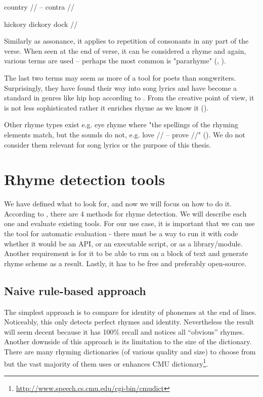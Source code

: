 country // -- contra //

hickory dickory dock //

\noindent Similarly as assonance, it applies to repetition of consonants in any part of the verse. When seen at the end of verse, it can be considered a rhyme and again, various terms are used -- perhaps the most common is "pararhyme" (\cite{britannica}, \cite{oxforddict2008literary}).
\newline

The last two terms may seem as more of a tool for poets than songwriters. Surprisingly, they have found their way into song lyrics and have become a standard in genres like hip hop according to \cite{vanphonological}. From the creative point of view, it is not less sophisticated rather it enriches rhyme as we know it (\cite{brogan2016poeticterms}).


Other rhyme types exist e.g. eye rhyme where "the spellings of the rhyming elements match, but the sounds do not, e.g. love // -- prove //" (\cite{oxforddict2008literary}). We do not consider them relevant for song lyrics or the purpose of this thesis.


\section{Rhyme detection tools}\label{rhyme_detection_tools}
We have defined what to look for, and now we will focus on how to do it. According to \cite{plechac2017presentation}, there are 4 methods for rhyme detection. We will describe each one and evaluate existing tools. For our use case, it is important that we can use the tool for automatic evaluation - there must be a way to run it with code whether it would be an API, or an executable script, or as a library/module. Another requirement is for it to be able to run on a block of text and generate rhyme scheme as a result. Lastly, it has to be free and preferably open-source.

\subsection{Naive rule-based approach} 
The simplest approach is to compare for identity of phonemes at the end of lines. Noticeably,  this only detects perfect rhymes and identity. Nevertheless the result will seem decent because it has 100\% recall and notices all ``obvious'' rhymes. Another downside of this approach is its limitation to the size of the dictionary. There are many rhyming dictionaries (of various quality and size) to choose from but the vast majority of them uses or enhances CMU dictionary\footnote{\url{http://www.speech.cs.cmu.edu/cgi-bin/cmudict}}. 
